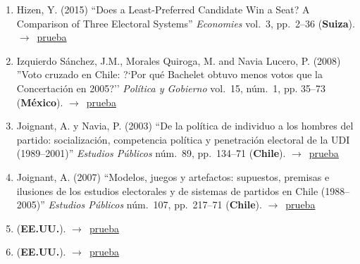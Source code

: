 \documentclass[12 pt, letter]{article}
\newenvironment{CitasMiTrabajo}{
    \begin{footnotesize}
    \begin{enumerate}[label={\footnotesize\emph{cita~\arabic*}},ref=\arabic*] %
        \setlength{\itemsep}{.1\itemsep}
        \setlength{\parskip}{.1\parskip}
    }{\end{enumerate}\end{footnotesize}}
\begin{document}
\begin{CitasMiTrabajo}
        \item Hizen, Y. (2015)
        ``Does a Least-Preferred Candidate Win a Seat? A Comparison of Three Electoral Systems''
        \emph{Economies} vol.\ 3, pp.\ 2--36 (\textbf{Suiza}). $\rightarrow$~\href{https://github.com/emagar/cv/blob/master/citasMiTrab/mrs/hizenThreeSystems2015economies.pdf}{prueba}

        \item Izquierdo S\'anchez, J.M., Morales Quiroga, M. and Navia Lucero, P. (2008)
        ''Voto cruzado en Chile: ?`Por qu\'e Bachelet obtuvo menos votos que la Concertaci\'on en 2005?''
        \emph{Pol\'itica y Gobierno} vol.\ 15, n\'um.\ 1, pp. 35--73 (\textbf{M\'exico}). $\rightarrow$~\href{https://github.com/emagar/cv/blob/master/citasMiTrab/mrs/izquierdoetal2008pyg.pdf}{prueba}

        \item Joignant, A. y Navia, P. (2003)
        ``De la pol\'itica de individuo a los hombres del partido: socializaci\'on, competencia pol\'itica y penetraci\'on electoral
        de la UDI (1989--2001)'' \emph{Estudios P\'ublicos} n\'um.\ 89, pp.\ 134--71 (\textbf{Chile}). $\rightarrow$~\href{https://github.com/emagar/cv/blob/master/citasMiTrab/mrs/joigNavia.pdf}{prueba}

        \item Joignant, A. (2007)
        ``Modelos, juegos y artefactos: supuestos, premisas e ilusiones de los estudios electorales y de sistemas de partidos
        en Chile (1988--2005)'' \emph{Estudios P\'ublicos} n\'um.\ 107, pp.\ 217--71  (\textbf{Chile}). $\rightarrow$~\href{https://github.com/emagar/cv/blob/master/citasMiTrab/mrs/joignant07.pdf}{prueba}

      \item {} (\textbf{EE.UU.}). $\rightarrow$~\href{https://www.researchgate.net/profile/Patricio_Navia2/publication/289108699_Assessing_the_effectiveness_of_gender_quotas_in_open-list_proportional_representation_electoral_systems/links/5a3abb5da6fdcc7ffe63e778/Assessing-the-effectiveness-of-gender-quotas-in-open-list-proportional-representation-electoral-systems.pdf}{prueba}

        \item {} (\textbf{EE.UU.}). $\rightarrow$~\href{https://academiccommons.columbia.edu/doi/10.7916/D8C827CS}{prueba}


\end{CitasMiTrabajo}
\end{document}
